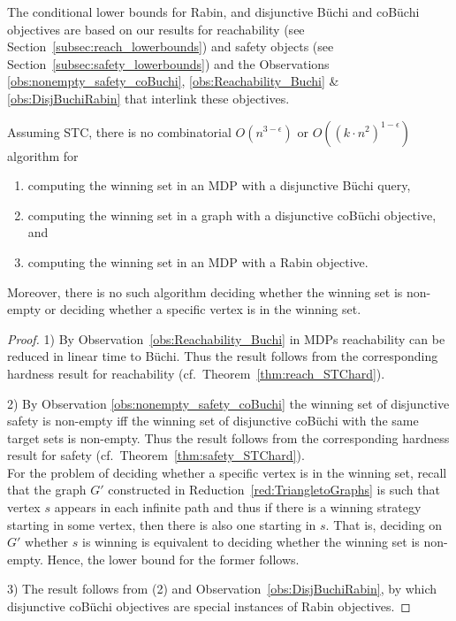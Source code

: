\documentclass[11pt,letterpaper]{article}
\begin{document}
The conditional lower bounds for Rabin, and disjunctive  Büchi and coBüchi objectives are based 
on our results for reachability (see Section~\ref{subsec:reach_lowerbounds}) and safety objects 
(see Section~\ref{subsec:safety_lowerbounds}) and 
the Observations \ref{obs:nonempty_safety_coBuchi}, \ref{obs:Reachability_Buchi} \& \ref{obs:DisjBuchiRabin}
that interlink these objectives.

\begin{proposition}
  Assuming STC, there is no combinatorial $O(n^{3-\epsilon})$ or $O((k\cdot n^2)^{1-\epsilon})$ algorithm for 
  \begin{enumerate}
   \item computing the winning set in an MDP with a disjunctive Büchi query,
   \item computing the winning set in a graph with a disjunctive coBüchi objective, and
   \item computing the winning set in an MDP with a Rabin objective.
  \end{enumerate}
  Moreover, there is no such algorithm deciding whether the winning set is non-empty
  or deciding whether a specific vertex is in the winning set.
\end{proposition}
\begin{proof}
 1) By Observation~\ref{obs:Reachability_Buchi} in MDPs reachability can be reduced in
 linear time to Büchi. Thus the result follows from
    the corresponding hardness result for reachability (cf.\ Theorem~\ref{thm:reach_STChard}).
    
 2) By Observation \ref{obs:nonempty_safety_coBuchi} the winning set of disjunctive safety is non-empty iff
    the winning set of disjunctive coBüchi with the same target sets is non-empty. Thus 
    the result follows from the corresponding hardness result for safety (cf.\ Theorem~\ref{thm:safety_STChard}).\\
    For the problem of deciding whether a specific vertex is in the winning set, recall
    that the graph $G'$ constructed in Reduction~\ref{red:TriangletoGraphs} is such that vertex $s$
    appears in each infinite path and thus if there is a winning strategy starting in some vertex,
    then there is also one starting in $s$. 
    That is, deciding on $G'$ whether $s$ is winning is equivalent to deciding whether the winning
    set is non-empty. Hence, the lower bound for the former follows.    
    
 3) The result follows from (2) and Observation~\ref{obs:DisjBuchiRabin}, by which disjunctive coBüchi objectives are special instances of Rabin objectives.
\end{proof}
\end{document}
